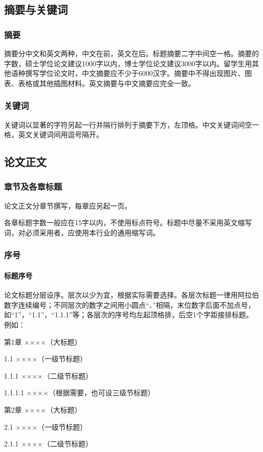 \subsection{摘要与关键词}
\subsubsection{摘要}
摘要分中文和英文两种，中文在前，英文在后。标题摘要二字中间空一格。摘要的字数，硕士学位论文建议1000字以内，博士学位论文建议3000字以内。留学生用其他语种撰写学位论文时，中文摘要应不少于6000汉字。摘要中不得出现图片、图表、表格或其他插图材料。英文摘要与中文摘要应完全一致。
\subsubsection{关键词}
关键词以显著的字符另起一行并隔行排列于摘要下方，左顶格。中文关键词间空一格，英文关键词间用逗号隔开。

\subsection{论文正文}
\subsubsection{章节及各章标题}
论文正文分章节撰写，每章应另起一页。

各章标题字数一般应在15字以内，不使用标点符号。标题中尽量不采用英文缩写词，对必须采用者，应使用本行业的通用缩写词。
\subsubsection{序号}
\paragraph{标题序号}
论文标题分层设序。层次以少为宜，根据实际需要选择。各层次标题一律用阿拉伯数字连续编号；不同层次的数字之间用小圆点“．”相隔，末位数字后面不加点号，如“1”，“1.1”，“1.1.1”等；各层次的序号均左起顶格排，后空1个字距接排标题。例如：

第1章 ××××（大标题） 

1.1 ××××（一级节标题）

1.1.1 ××××（二级节标题）

1.1.1.1 ××××（根据需要，也可设三级节标题）

第2章 ××××（大标题）

2.1 ××××（一级节标题）

2.1.1 ××××（二级节标题）

